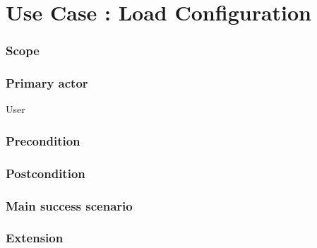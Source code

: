 \section{Use Case : Load Configuration}

\subsubsection{Scope}

\subsubsection{Primary actor}
User
\subsubsection{Precondition}

\subsubsection{Postcondition}

\subsubsection{Main success scenario}

\subsubsection{Extension}
